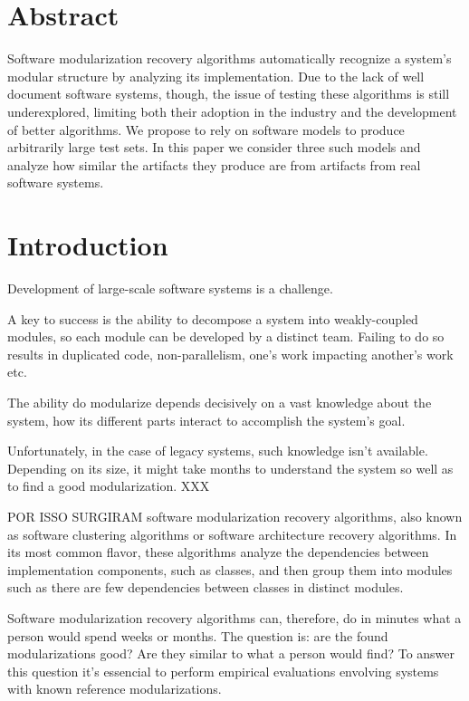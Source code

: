 \section{Abstract}

Software modularization recovery algorithms automatically recognize a system's
modular structure by analyzing its implementation.
Due to the lack of well document software systems, though, the issue of testing
these algorithms is still underexplored, limiting both their adoption in the
industry and the development of better algorithms.
We propose to rely on software models to produce arbitrarily large test sets. In
this paper we consider three such models and analyze how similar the artifacts
they produce are from artifacts from real software systems.
\cite{Pollet2007}

\section{Introduction}

Development of large-scale software systems is a challenge.

A key to success is the ability to decompose a system into weakly-coupled
modules, so each module can be developed by a distinct team. Failing to do so
results in duplicated code, non-parallelism, one's work impacting another's work
etc.

The ability do modularize depends decisively on a vast knowledge about the
system, how its different parts interact to accomplish the system's goal.

Unfortunately, in the case of legacy systems, such knowledge isn't available.
Depending on its size, it might take months to understand the system so well as
to find a good modularization. XXX \cite{Parnas1972}

POR ISSO SURGIRAM software modularization recovery algorithms, also known as
software clustering algorithms or software architecture recovery algorithms. In
its most common flavor, these algorithms analyze the dependencies between
implementation components, such as classes, and then group them into modules
such as there are few dependencies between classes in distinct modules.

Software modularization recovery algorithms can, therefore, do in minutes what a
person would spend weeks or months. The question is: are the found
modularizations good? Are they similar to what a person would find? To answer
this question it's essencial to perform empirical evaluations envolving systems
with known reference modularizations.

